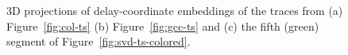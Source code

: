  \begin{figure}[!ht]
    \hfill
        \hfill
    \caption{3D projections of delay-coordinate embeddings of the
       traces from (a) Figure~\ref{fig:col-ts} (b)
       Figure~\ref{fig:gcc-ts} and (c) the fifth (green) segment of
       Figure~\ref{fig:svd-ts-colored}.}
    \label{fig:embedding}
  \end{figure}
%

